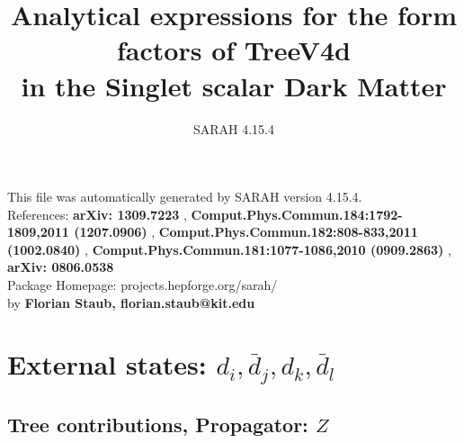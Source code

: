 \documentclass[A4,landscape]{article}
\begin{document}
\title{Analytical expressions for the form factors of TreeV4d\\ in the Singlet scalar Dark Matter } 
 \author{SARAH 4.15.4} 
 \maketitle 
 \vspace{10cm} 
This file was automatically generated by SARAH version 4.15.4.  \\ 
References: {\bf arXiv: 1309.7223 }, {\bf Comput.Phys.Commun.184:1792-1809,2011 (1207.0906) }, {\bf Comput.Phys.Commun.182:808-833,2011 (1002.0840) }, {\bf Comput.Phys.Commun.181:1077-1086,2010 (0909.2863) }, {\bf arXiv: 0806.0538 } \\ 
Package Homepage: projects.hepforge.org/sarah/ \\ 
by {\bf Florian Staub, florian.staub@kit.edu} 
 \pagebreak 
 \tableofcontents 
 \pagebreak 
\section{External states: ${d_{{i}}, \bar{d}_{{j}}, d_{{k}}, \bar{d}_{{l}}}$} 
\subsection{Tree contributions, Propagator: $Z$} 
\end{document}
